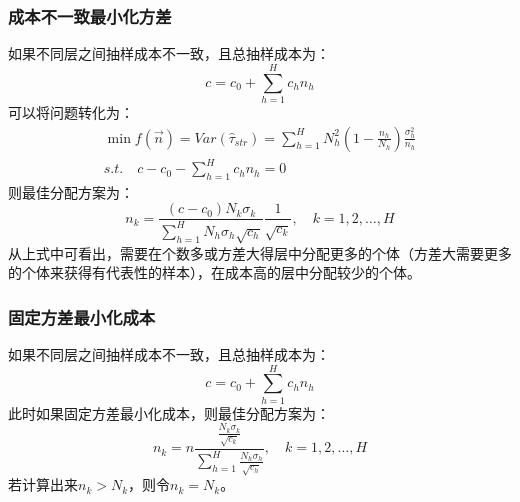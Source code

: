 \subsubsection{成本不一致最小化方差}
如果不同层之间抽样成本不一致，且总抽样成本为：
\begin{equation*}
	c=c_0+\sum_{h=1}^Hc_hn_h
\end{equation*}
可以将问题转化为：
\begin{gather*}
	\min f(\overrightarrow{n})=Var(\hat{\tau}_{str})=\sum_{h=1}^HN_h^2\left(1-\frac{n_h}{N_h}\right)\frac{\sigma_h^2}{n_h} \\
	s.t.\quad c-c_0-\sum_{h=1}^Hc_hn_h=0
\end{gather*}
则最佳分配方案为：
\begin{equation*}
	n_k=\frac{(c-c_0)N_k\sigma_k}{\sum\limits_{h=1}^HN_h\sigma_h\sqrt{c_h}}\frac{1}{\sqrt{c_k}},\quad k=1,2,\dots,H
\end{equation*}
从上式中可看出，需要在个数多或方差大得层中分配更多的个体（方差大需要更多的个体来获得有代表性的样本），在成本高的层中分配较少的个体。
\subsubsection{固定方差最小化成本}
如果不同层之间抽样成本不一致，且总抽样成本为：
\begin{equation*}
	c=c_0+\sum_{h=1}^Hc_hn_h
\end{equation*}
此时如果固定方差最小化成本，则最佳分配方案为：
\begin{equation*}
	n_k=n\frac{\frac{N_k\sigma_k}{\sqrt{c_k}}}{\sum\limits_{h=1}^H\frac{N_h\sigma_h}{\sqrt{c_h}}},\quad k=1,2,\dots,H
\end{equation*}
若计算出来$n_k>N_k$，则令$n_k=N_k$。


